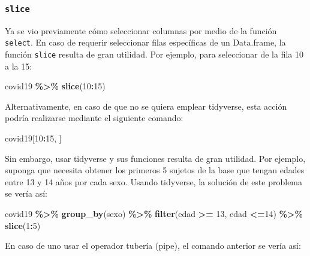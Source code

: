 \documentclass[
]{article}
\newenvironment{Shaded}{\begin{snugshade}}{\end{snugshade}}
\newcommand{\DecValTok}[1]{\textcolor[rgb]{0.00,0.00,0.81}{#1}}
\newcommand{\FunctionTok}[1]{\textcolor[rgb]{0.13,0.29,0.53}{\textbf{#1}}}
\newcommand{\NormalTok}[1]{#1}
\newcommand{\SpecialCharTok}[1]{\textcolor[rgb]{0.81,0.36,0.00}{\textbf{#1}}}
\begin{document}
\subsubsection{\texorpdfstring{\texttt{slice}}{slice}}\label{slice}

Ya se vio previamente cómo seleccionar columnas por medio de la función
\texttt{select}. En caso de requerir seleccionar filas específicas de un
Data.frame, la función \texttt{slice} resulta de gran utilidad. Por
ejemplo, para seleccionar de la fila 10 a la 15:

\begin{Shaded}
\begin{Highlighting}[]
\NormalTok{covid19 }\SpecialCharTok{\%\textgreater{}\%} \FunctionTok{slice}\NormalTok{(}\DecValTok{10}\SpecialCharTok{:}\DecValTok{15}\NormalTok{)}
\end{Highlighting}
\end{Shaded}

Alternativamente, en caso de que no se quiera emplear tidyverse, esta
acción podría realizarse mediante el siguiente comando:

\begin{Shaded}
\begin{Highlighting}[]
\NormalTok{covid19[}\DecValTok{10}\SpecialCharTok{:}\DecValTok{15}\NormalTok{, ]}
\end{Highlighting}
\end{Shaded}

Sin embargo, usar tidyverse y sus funciones resulta de gran utilidad.
Por ejemplo, suponga que necesita obtener los primeros 5 sujetos de la
base que tengan edades entre 13 y 14 años por cada sexo. Usando
tidyverse, la solución de este problema se vería así:

\begin{Shaded}
\begin{Highlighting}[]
\NormalTok{covid19 }\SpecialCharTok{\%\textgreater{}\%} 
  \FunctionTok{group\_by}\NormalTok{(sexo) }\SpecialCharTok{\%\textgreater{}\%} 
  \FunctionTok{filter}\NormalTok{(edad }\SpecialCharTok{\textgreater{}=} \DecValTok{13}\NormalTok{, edad }\SpecialCharTok{\textless{}=}\DecValTok{14}\NormalTok{) }\SpecialCharTok{\%\textgreater{}\%}
  \FunctionTok{slice}\NormalTok{(}\DecValTok{1}\SpecialCharTok{:}\DecValTok{5}\NormalTok{)}
\end{Highlighting}
\end{Shaded}

En caso de uno usar el operador tubería (pipe), el comando anterior se
vería así:
\end{document}

